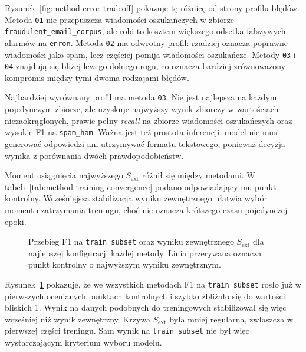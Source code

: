 Rysunek~\ref{fig:method-error-tradeoff} pokazuje tę różnicę od strony profilu
błędów. Metoda \texttt{01} nie przepuszcza wiadomości oszukańczych w
zbiorze \texttt{fraudulent\_email\_corpus}, ale robi to kosztem większego
odsetka fałszywych alarmów na \texttt{enron}. Metoda \texttt{02} ma odwrotny
profil: rzadziej oznacza poprawne wiadomości jako spam, lecz częściej pomija
wiadomości oszukańcze. Metody \texttt{03} i \texttt{04} znajdują się bliżej
lewego dolnego rogu, co oznacza bardziej zrównoważony kompromis między tymi
dwoma rodzajami błędów.

Najbardziej wyrównany profil ma metoda \texttt{03}. Nie jest najlepsza na każdym
pojedynczym zbiorze, ale uzyskuje najwyższy wynik zbiorczy w wartościach
niezaokrąglonych, prawie pełny \emph{recall} na zbiorze wiadomości
oszukańczych oraz wysokie F1 na \texttt{spam\_ham}. Ważna jest też prostota
inferencji: model nie musi generować odpowiedzi ani utrzymywać formatu
tekstowego, ponieważ decyzja wynika z porównania dwóch prawdopodobieństw.

Moment osiągnięcia najwyższego \(S_{\mathrm{ext}}\) różnił się między metodami.
W tabeli~\ref{tab:method-training-convergence} podano odpowiadający mu punkt
kontrolny. Wcześniejsza stabilizacja wyniku zewnętrznego ułatwia wybór momentu
zatrzymania treningu, choć nie oznacza krótszego czasu pojedynczej epoki.

\begin{table}[htbp]
\centering
\small
\resizebox{\textwidth}{!}{}
\caption{Moment uzyskania najlepszego wyniku zewnętrznego dla najlepszej
konfiguracji każdej metody.}
\label{tab:method-training-convergence}
\end{table}

\begin{figure}[htbp]
\centering

\caption{Przebieg F1 na \texttt{train\_subset} oraz wyniku zewnętrznego
\(S_{\mathrm{ext}}\) dla najlepszej konfiguracji każdej metody. Linia
przerywana oznacza punkt kontrolny o najwyższym wyniku zewnętrznym.}
\label{fig:method-training-trajectories}
\end{figure}

Rysunek~\ref{fig:method-training-trajectories} pokazuje, że we wszystkich
metodach F1 na \texttt{train\_subset} rosło już w pierwszych
ocenianych punktach kontrolnych i szybko zbliżało się do wartości bliskich 1.
Wynik na danych podobnych do treningowych stabilizował się więc wcześniej niż
wynik zewnętrzny. Krzywa \(S_{\mathrm{ext}}\) była mniej regularna, zwłaszcza w
pierwszej części treningu. Sam wynik na \texttt{train\_subset} nie był więc
wystarczającym kryterium wyboru modelu.

